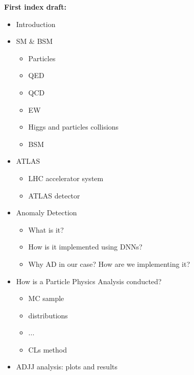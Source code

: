 \noindent \textbf{First index draft:}
\begin{itemize}
    \item Introduction
    \item SM \& BSM
    \begin{itemize}
        \item Particles
        \item QED
        \item QCD
        \item EW
        \item Higgs and particles collisions
        \item BSM
    \end{itemize}
    \item ATLAS
    \begin{itemize}
        \item LHC accelerator system
        \item ATLAS detector
    \end{itemize}
    \item Anomaly Detection
    \begin{itemize}
        \item What is it?
        \item How is it implemented using DNNs?
        \item Why AD in our case? How are we implementing it?
    \end{itemize}
    \item How is a Particle Physics Analysis conducted?
    \begin{itemize}
        \item MC sample
        \item distributions
        \item ...
        \item CLs method
    \end{itemize}
    \item ADJJ analysis: plots and results
\end{itemize}



